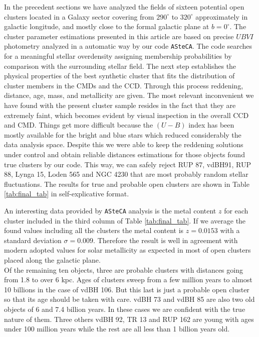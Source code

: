 \documentclass[draft]{aa}
\begin{document}
In the precedent sections we have analyzed the fields of sixteen potential
open clusters located in a Galaxy sector covering from $290^\circ$ to
$320^\circ$ approximately in galactic longitude, and mostly close to the formal
galactic plane at $b=0^\circ$.
The cluster parameter estimations presented in this article are based on
precise $UBVI$ photometry analyzed in a automatic way by
our code \texttt{ASteCA}. The code searches for a meaningful stellar overdensity
assigning membership probabilities by comparison with the surrounding stellar
field.
The next step establishes the physical properties of the best synthetic cluster
that fits the distribution of cluster members in the CMDs and the CCD.
Through this process reddening, distance, age, mass, and metallicity are
given.
The most relevant inconvenient we have found with the present cluster
sample resides in the fact that they are extremely faint, which becomes evident
by visual inspection in the overall CCD and CMD.
Things get more difficult because the $(U-B)$ index has been mostly available for
the bright and blue stars which reduced considerably the data analysis space.
Despite this we were able to keep the reddening solutions under control and
obtain reliable distances estimations for those objects found true clusters by
our code. This way, we can safely reject RUP 87, vdBH91, RUP 88, Lynga 15,
Loden 565 and NGC 4230 that are most probably random stellar fluctuations. The
results for true and probable open clusters are shown in Table 
\ref{tab:final_tab} in self-explicative format.

An interesting data provided by \texttt{ASteCA} analysis is the
metal content $z$ for each cluster included in the third column of Table 
\ref{tab:final_tab}. If we average the found values including all the clusters
the metal content is $z=0.0153$ with a standard deviation $\sigma = 0.009$.
Therefore the result is well in agreement with modern adopted values for solar
metallicity as expected in most of open clusters placed along the galactic
plane.\\

Of the remaining ten objects, three are probable clusters with distances going
from 1.8 to over 6 kpc. Ages of clusters sweep from a few million years to
almost 10 billions in the case of vdBH 106. But this last is just a probable
open cluster so that its age should be taken with care. vdBH 73 and vdBH 85 are
also two old objects of 6 and 7.4 billion years. In these cases we are
confident with the true nature of them. Three others  vdBH 92, TR 13 and RUP
162 are young with ages under 100 million years while the rest are all less
than 1 billion years old.
\end{document}
